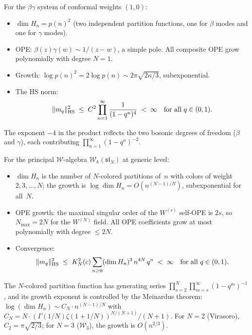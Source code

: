 \begin{computation}
For the $\beta\gamma$ system of conformal weights $(1,0)$:
\begin{itemize}
\item $\dim H_n = p(n)^2$ (two independent partition functions, one for $\beta$ modes and one for $\gamma$ modes).
\item OPE: $\beta(z)\gamma(w) \sim 1/(z-w)$, a simple pole. All composite OPE grow polynomially with degree $N = 1$.
\item Growth: $\log p(n)^2 = 2\log p(n) \sim 2\pi\sqrt{2n/3}$, subexponential.
\item The HS norm:
 \begin{equation}%
 \|m_q\|_{\HS}^2 \;\leq\; C^2\prod_{n=1}^\infty \frac{1}{(1-q^n)^{4}} \;<\; \infty \quad\text{for all } q \in (0,1).
 \end{equation}
\end{itemize}
The exponent $-4$ in the product reflects the two bosonic degrees of freedom ($\beta$ and $\gamma$), each contributing $\prod_{n=1}^\infty (1-q^n)^{-2}$.
\end{computation}

\begin{computation}
For the principal $\mathcal{W}$-algebra $\mathcal{W}_k(\mathfrak{sl}_N)$ at generic level:
\begin{itemize}
\item $\dim H_n$ is the number of $N$-colored partitions of~$n$ with colors of weight $2, 3, \ldots, N$; the growth is $\log \dim H_n = O(n^{(N-1)/N})$, subexponential for all~$N$.
\item OPE growth: the maximal singular order of the $W^{(s)}$ self-OPE is $2s$, so $N_{\max} = 2N$ for the $W^{(N)}$ field. All OPE coefficients grow at most polynomially with degree $\leq 2N$.
\item Convergence:
 \begin{equation}%
 \|m_q\|_{\HS}^2 \;\leq\; K_N^2(c) \sum_{n \geq 0} (\dim H_n)^3\,n^{4N}\,q^n \;<\; \infty \quad\text{for all } q \in (0,1).
 \end{equation}
\end{itemize}
The $N$-colored partition function has generating series $\prod_{s=2}^N \prod_{m=s}^\infty (1-q^m)^{-1}$, and its growth exponent is controlled by the Meinardus theorem: $\log(\dim H_n) \sim C_N \cdot n^{(N-1)/N}$ with $C_N = N \cdot (\Gamma(1/N) \zeta(1+1/N))^{N/(N+1)} / (N+1)$. For $N = 2$ (Virasoro), $C_2 = \pi\sqrt{2/3}$; for $N = 3$ ($\mathcal{W}_3$), the growth is $O(n^{2/3})$.
\end{computation}

